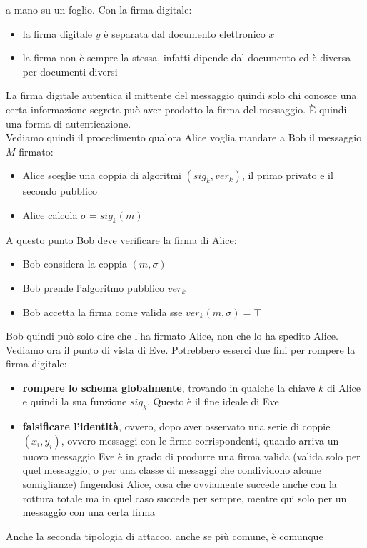 \documentclass[a4paper,12pt, oneside]{book}
\begin{document}
a mano su un foglio. Con la firma digitale:
\begin{itemize}
  \item la firma digitale $y$ è separata dal documento elettronico $x$
  \item la firma non è sempre la stessa, infatti dipende dal documento ed è
  diversa per documenti diversi  
\end{itemize}
La firma digitale autentica il mittente del messaggio quindi solo chi conosce
una certa informazione segreta può aver prodotto la firma del messaggio. È
quindi una forma di autenticazione.\\
Vediamo quindi il procedimento qualora Alice voglia mandare a Bob il messaggio
$M$ firmato:
\begin{itemize}
  \item Alice sceglie una coppia di algoritmi $(sig_k,ver_k)$, il primo privato
  e il secondo pubblico
  \item Alice calcola $\sigma=sig_k(m)$
\end{itemize}
A questo punto Bob deve verificare la firma di Alice:
\begin{itemize}
  \item Bob considera la coppia $(m,\sigma)$
  \item Bob prende l'algoritmo pubblico $ver_k$
  \item Bob accetta la firma come valida sse $ver_k(m,\sigma)=\top$
\end{itemize}
Bob quindi può solo dire che l'ha firmato Alice, non che lo ha spedito Alice.\\
Vediamo ora il punto di vista di Eve. Potrebbero esserci due fini per rompere la
firma digitale:
\begin{itemize}
  \item \textbf{rompere lo schema globalmente}, trovando in qualche la chiave
  $k$ di Alice e quindi la sua funzione $sig_k$. Questo è il fine ideale di Eve
  \item \textbf{falsificare l'identità}, ovvero, dopo aver osservato una serie
  di coppie $(x_i,y_i)$, ovvero messaggi con le firme corrispondenti, quando
  arriva un nuovo messaggio Eve è in grado di produrre una firma valida (valida
  solo per quel messaggio, o per una classe di messaggi che condividono alcune
  somiglianze) fingendosi Alice, cosa che ovviamente succede anche con la
  rottura totale ma in quel caso succede per sempre, mentre qui solo per un
  messaggio con una certa firma
\end{itemize}
Anche la seconda tipologia di attacco, anche se più comune, è comunque
\end{document}
